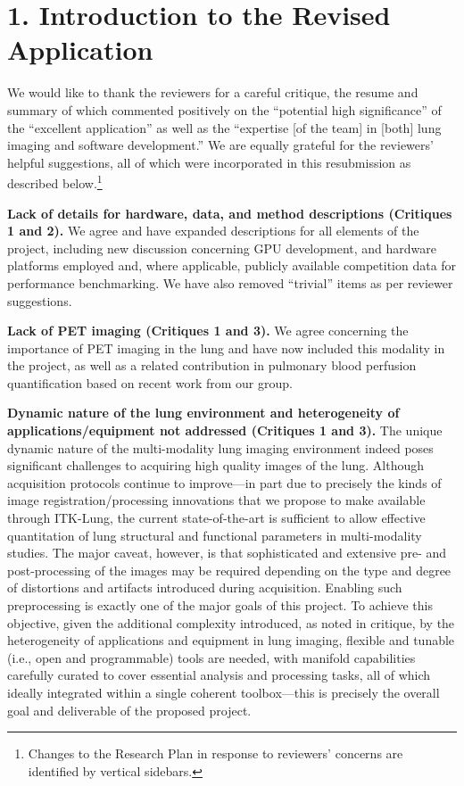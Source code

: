 \documentclass[11pt,]{article}
\title{}
\author{}
\date{}
\let\rmarkdownfootnote\footnote%
\def\footnote{\protect\rmarkdownfootnote}
\begin{document}
\maketitle


\section{1. Introduction to the Revised
Application}\label{introduction-to-the-revised-application}

We would like to thank the reviewers for a careful critique, the resume
and summary of which commented positively on the ``potential high
significance'' of the ``excellent application'' as well as the
``expertise {[}of the team{]} in {[}both{]} lung imaging and software
development.'' We are equally grateful for the reviewers' helpful
suggestions, all of which were incorporated in this resubmission as
described below.\footnote{Changes to the Research Plan in response to
  reviewers' concerns are identified by vertical sidebars.}

\textbf{Lack of details for hardware, data, and method descriptions
(Critiques 1 and 2). } We agree and have expanded descriptions for all
elements of the project, including new discussion concerning GPU
development, and hardware platforms employed and, where applicable,
publicly available competition data for performance benchmarking. We
have also removed ``trivial'' items as per reviewer suggestions.

\textbf{Lack of PET imaging (Critiques 1 and 3).} We agree concerning
the importance of PET imaging in the lung and have now included this
modality in the project, as well as a related contribution in pulmonary
blood perfusion quantification based on recent work from our group.

\textbf{Dynamic nature of the lung environment and heterogeneity of
applications/equipment not addressed (Critiques 1 and 3).} The unique
dynamic nature of the multi-modality lung imaging environment indeed
poses significant challenges to acquiring high quality images of the
lung. Although acquisition protocols continue to improve---in part due
to precisely the kinds of image registration/processing innovations that
we propose to make available through ITK-Lung, the current
state-of-the-art is sufficient to allow effective quantitation of lung
structural and functional parameters in multi-modality studies. The
major caveat, however, is that sophisticated and extensive pre- and
post-processing of the images may be required depending on the type and
degree of distortions and artifacts introduced during acquisition.
Enabling such preprocessing is exactly one of the major goals of this
project. To achieve this objective, given the additional complexity
introduced, as noted in critique, by the heterogeneity of applications
and equipment in lung imaging, flexible and tunable (i.e., open and
programmable) tools are needed, with manifold capabilities carefully
curated to cover essential analysis and processing tasks, all of which
ideally integrated within a single coherent toolbox---this is precisely
the overall goal and deliverable of the proposed project.
\end{document}
